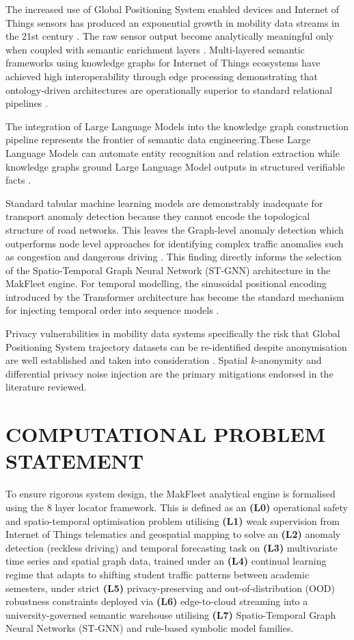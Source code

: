 \documentclass{ieeeaccess}
\begin{document}
The increased use of Global Positioning System enabled devices and Internet of Things sensors has produced an exponential growth in mobility data streams in the 21st century \cite{gubbi2013}. The raw sensor output become analytically meaningful only when coupled with semantic enrichment layers \cite{gubbi2013}. Multi-layered semantic
frameworks using knowledge graphs for Internet of Things ecosystems have achieved high
interoperability through edge processing demonstrating that ontology-driven architectures are operationally superior to standard
relational pipelines \cite{pan2024}.

The integration of Large Language Models into the knowledge graph construction pipeline represents the frontier of semantic data engineering.These Large Language Models can automate entity recognition and relation extraction while knowledge graphs ground Large Language Model outputs in structured verifiable facts \cite{pan2024}.

Standard tabular machine learning models are demonstrably inadequate for transport anomaly detection because they cannot encode the
topological structure of road networks. This leaves the Graph-level anomaly detection which
outperforms node level approaches for identifying complex traffic anomalies such as congestion and dangerous driving \cite{zhu2022}.
This finding directly informs the selection of the Spatio-Temporal Graph Neural Network (ST-GNN) architecture in the MakFleet engine. For
temporal modelling, the sinusoidal positional encoding introduced by the Transformer architecture has become the standard mechanism for injecting temporal order into sequence models \cite{vaswani2017}.

Privacy vulnerabilities in mobility data systems specifically the risk that Global Positioning System trajectory datasets can be re-identified despite anonymisation are well established and taken into consideration  \cite{demontjoye2013}. Spatial $k$-anonymity and differential privacy noise injection are the primary mitigations endorsed in the literature reviewed\cite{demontjoye2013}.


\section{COMPUTATIONAL PROBLEM STATEMENT}

To ensure rigorous system design, the MakFleet analytical engine is formalised using the 8 layer locator framework. This is defined as an
\textbf{(L0)} operational safety and spatio-temporal optimisation
problem utilising \textbf{(L1)} weak supervision from Internet of Things telematics
and geospatial mapping to solve an \textbf{(L2)} anomaly detection (reckless driving) and temporal forecasting task on \textbf{(L3)} multivariate time series and spatial graph data, trained under an \textbf{(L4)} continual learning regime that adapts to shifting student traffic patterns between academic semesters, under strict \textbf{(L5)} privacy-preserving and out-of-distribution (OOD) robustness constraints deployed via \textbf{(L6)} edge-to-cloud streaming into a university-governed semantic warehouse utilising
\textbf{(L7)} Spatio-Temporal Graph Neural Networks (ST-GNN) and rule-based symbolic model families.
\end{document}
